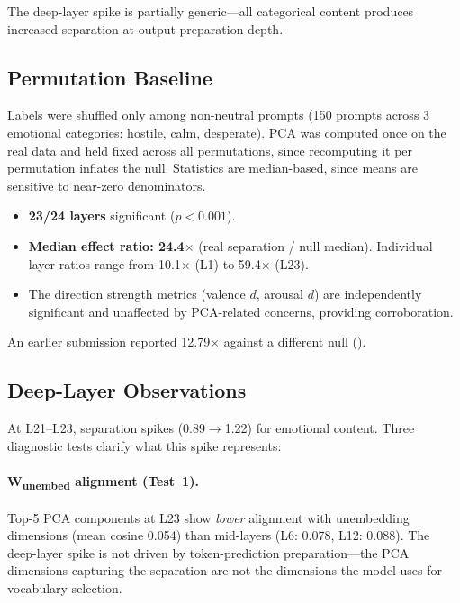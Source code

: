 \documentclass[11pt,a4paper]{article}
\begin{document}
The deep-layer spike is partially generic---all categorical content
produces increased separation at output-preparation depth.

\subsection{Permutation Baseline}

Labels were shuffled only among non-neutral prompts (150 prompts across 3
emotional categories: hostile, calm, desperate). PCA was computed once on the real data and held
fixed across all permutations, since recomputing it per permutation
inflates the null. Statistics are median-based, since means are
sensitive to near-zero denominators.

\begin{itemize}[nosep]
    \item \textbf{23/24 layers} significant ($p < 0.001$).
    \item \textbf{Median effect ratio: 24.4$\times$} (real separation /
          null median). Individual layer ratios range from 10.1$\times$
          (L1) to 59.4$\times$ (L23).
    \item The direction strength metrics (valence $d$, arousal $d$) are
          independently significant and unaffected by PCA-related
          concerns, providing corroboration.
\end{itemize}

An earlier submission reported 12.79$\times$ against a different null
().

\subsection{Deep-Layer Observations}

At L21--L23, separation spikes (0.89$\to$1.22) for emotional content.
Three diagnostic tests clarify what this spike represents:

\paragraph{W\textsubscript{unembed} alignment (Test~1).} Top-5 PCA
components at L23 show \emph{lower} alignment with unembedding
dimensions (mean cosine 0.054) than mid-layers (L6: 0.078, L12: 0.088).
The deep-layer spike is not driven by token-prediction
preparation---the PCA dimensions capturing the separation are not the
dimensions the model uses for vocabulary selection.
\end{document}
